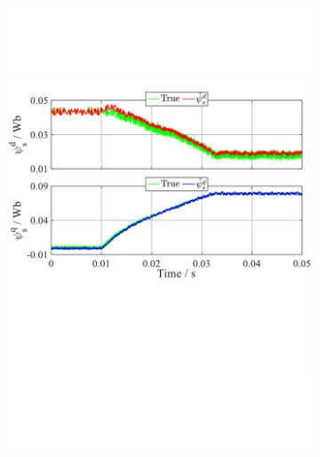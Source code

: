 \begin{figure}[H]
\begin{subfigure}[b]{0.80\textwidth}
        \includegraphics[scale=0.55]{chapters/Fig4.5b.pdf}
        \caption{}
        \label{Fig:4.5b}
    \end{subfigure}
        \vfill
    \begin{subfigure}[b]{0.80\textwidth}
        \centering

\end{subfigure}
\end{figure}
